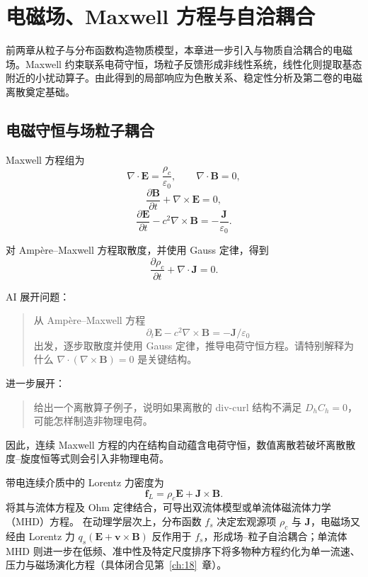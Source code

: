 \chapter{电磁场、Maxwell 方程与自洽耦合}\label{ch:3}

\begin{chaptersummary}
前两章从粒子与分布函数构造物质模型，本章进一步引入与物质自洽耦合的电磁场。Maxwell 约束联系电荷守恒，场粒子反馈形成非线性系统，线性化则提取基态附近的小扰动算子。由此得到的局部响应为色散关系、稳定性分析及第二卷的电磁离散奠定基础。
\end{chaptersummary}

\section{电磁守恒与场粒子耦合}
Maxwell 方程组为
\[
\nabla\cdot\bm E=\frac{\rho_c}{\varepsilon_0},
\qquad
\nabla\cdot\bm B=0,
\]
\[
\frac{\partial\bm B}{\partial t}+\nabla\times\bm E=0,
\]
\[
\frac{\partial\bm E}{\partial t}
-c^2\nabla\times\bm B
=
-\frac{\bm J}{\varepsilon_0}.
\]

对 Amp\`ere--Maxwell 方程取散度，并使用 Gauss 定律，得到
\[
\frac{\partial\rho_c}{\partial t}
+\nabla\cdot\bm J=0.
\]

\begin{askai}
AI 展开问题：
\begin{quote}
从 Amp\`ere--Maxwell 方程
\[
\partial_t\bm E-c^2\nabla\times\bm B=-\bm J/\varepsilon_0
\]
出发，逐步取散度并使用 Gauss 定律，推导电荷守恒方程。请特别解释为什么 \(\nabla\cdot(\nabla\times\bm B)=0\) 是关键结构。
\end{quote}

进一步展开：
\begin{quote}
给出一个离散算子例子，说明如果离散的 div-curl 结构不满足 \(D_hC_h=0\)，可能怎样制造非物理电荷。
\end{quote}
\end{askai}

因此，连续 Maxwell 方程的内在结构自动蕴含电荷守恒，数值离散若破坏离散散度--旋度恒等式则会引入非物理电荷。

带电连续介质中的 Lorentz 力密度为
\[
\bm f_L=\rho_c\bm E+\bm J\times\bm B.
\]
将其与流体方程及 Ohm 定律结合，可导出双流体模型或单流体磁流体力学（MHD）方程。
在动理学层次上，分布函数 $f_s$ 决定宏观源项 $\rho_c$ 与 $\bm J$，电磁场又经由 Lorentz 力 $q_s(\bm E+\bm v\times\bm B)$ 反作用于 $f_s$，形成场--粒子自洽耦合；单流体 MHD 则进一步在低频、准中性及特定尺度排序下将多物种方程约化为单一流速、压力与磁场演化方程（具体闭合见第~\ref{ch:18}~章）。

